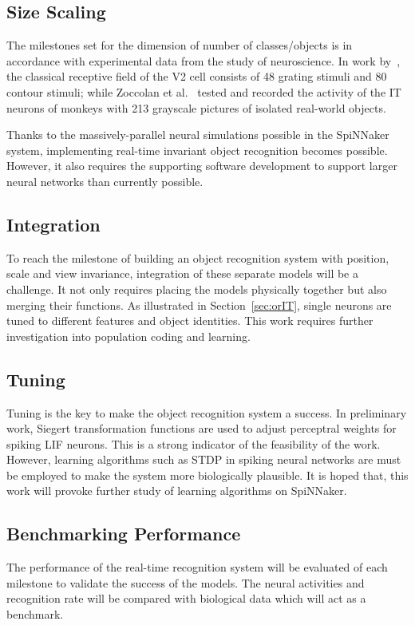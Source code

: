 \subsection{Size Scaling}
The milestones set for the dimension of number of classes/objects is in accordance with experimental data from the study of neuroscience.
In work by~\cite{hegde2004temporal}, the classical receptive field of the V2 cell consists of 48 grating stimuli and 80 contour stimuli; while Zoccolan et al.~\cite{zoccolan2007trade} tested and recorded the activity of the IT neurons of monkeys with 213 grayscale pictures of isolated real-world objects.

Thanks to the massively-parallel neural simulations possible in the SpiNNaker system, implementing real-time invariant object recognition becomes possible.
However, it also requires the supporting software development to support larger neural networks than currently possible.  
\subsection{Integration}
To reach the milestone of building an object recognition system with position, scale and view invariance, integration of these separate models will be a challenge.
It not only requires placing the models physically together but also merging their functions.
As illustrated in Section~\ref{sec:orIT}, single neurons are tuned to different features and object identities.
This work requires further investigation into population coding and learning. 
\subsection{Tuning}
Tuning is the key to make the object recognition system a success.
In preliminary work, Siegert transformation functions are used to adjust perceptral weights for spiking LIF neurons.
This is a strong indicator of the feasibility of the work.
However, learning algorithms such as STDP in spiking neural networks are must be employed to make the system more biologically plausible.
It is hoped that, this work will provoke further study of learning algorithms on SpiNNaker.
\subsection{Benchmarking Performance}
The performance of the real-time recognition system will be evaluated of each milestone to validate the success of the models.
The neural activities and recognition rate will be compared with biological data which will act as a benchmark.
